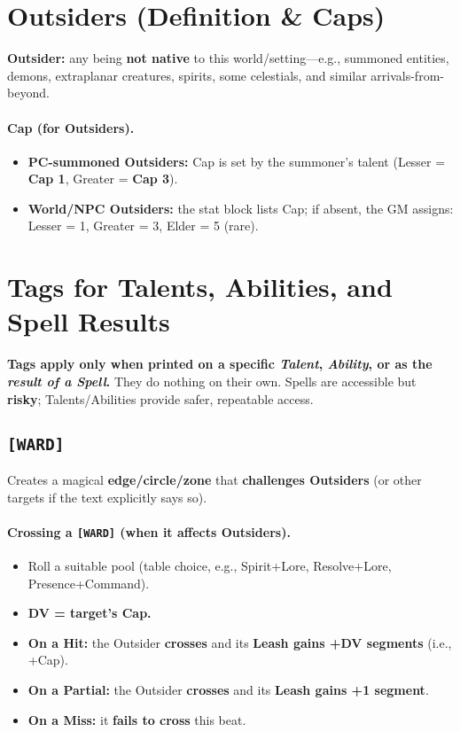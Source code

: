 \section{Outsiders (Definition \& Caps)}

\textbf{Outsider:} any being \textbf{not native} to this world/setting—e.g., summoned entities, demons, extraplanar creatures, spirits, some celestials, and similar arrivals-from-beyond.

\paragraph{Cap (for Outsiders).}
\begin{itemize}
  \item \textbf{PC-summoned Outsiders:} Cap is set by the summoner's talent (Lesser = \textbf{Cap 1}, Greater = \textbf{Cap 3}).
  \item \textbf{World/NPC Outsiders:} the stat block lists Cap; if absent, the GM assigns: Lesser = 1, Greater = 3, Elder = 5 (rare).
\end{itemize}

\section{Tags for Talents, Abilities, and Spell Results}

\textbf{Tags apply only when printed on a specific \emph{Talent}, \emph{Ability}, or as the \emph{result of a Spell}.}
They do nothing on their own. Spells are accessible but \textbf{risky}; Talents/Abilities provide safer, repeatable access.

\subsection{\texttt{[WARD]}}
Creates a magical \textbf{edge/circle/zone} that \textbf{challenges Outsiders} (or other targets if the text explicitly says so).

\paragraph{Crossing a \texttt{[WARD]} (when it affects Outsiders).}
\begin{itemize}
  \item Roll a suitable pool (table choice, e.g., Spirit+Lore, Resolve+Lore, Presence+Command).
  \item \textbf{DV = target's Cap.}
  \item \textbf{On a Hit:} the Outsider \textbf{crosses} and its \textbf{Leash gains +DV segments} (i.e., +Cap).
  \item \textbf{On a Partial:} the Outsider \textbf{crosses} and its \textbf{Leash gains +1 segment}.
  \item \textbf{On a Miss:} it \textbf{fails to cross} this beat.
\end{itemize}

